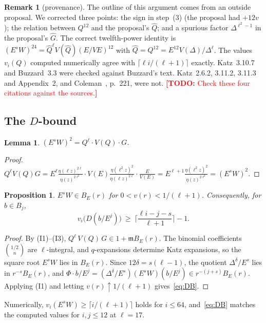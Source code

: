 \documentclass[11pt]{amsart}
\newcommand{\fm}{\mathfrak{m}}
\newcommand{\TODO}[1]{\textcolor{red}{\textbf{[TODO:} #1\textbf{]}}}
\theoremstyle{plain}
\newtheorem{proposition}[theorem]{Proposition}
\newtheorem{lemma}[theorem]{Lemma}
\theoremstyle{definition}
\newtheorem{remark}[theorem]{Remark}
\numberwithin{equation}{section}
\begin{document}
\begin{remark}[provenance]\label{rem:provenance}
The outline of this argument comes from an outside proposal. We corrected three points: the sign in step~(3) (the
proposal had $+12v$); the relation between $Q^{12}$ and the proposal's $\hat Q$; and a spurious factor
$\Delta^{\ell^2-1}$ in the proposal's $\hat G$. The correct twelfth-power identity is
$(E^sW)^{24}=\hat Q^\ell V(\hat Q)(E/VE)^{12}$ with $\hat Q=Q^{12}=E^{12}V(\Delta)/\Delta^\ell$.
The values $v_i(Q)$ computed numerically agree with $\lceil\ell i/(\ell+1)\rceil$ exactly. Katz~3.10.7 and Buzzard~3.3
were checked against Buzzard's text. Katz~2.6.2, 3.11.2, 3.11.3 and Appendix~2, and Coleman~\cite{Coleman1996}, p.~221,
were not. \TODO{Check these four citations against the sources.}
\end{remark}

\subsection{The $D$-bound}
\begin{lemma}\label{lem:eta}
$(E^sW)^2=Q^\ell\cdot V(Q)\cdot G$.
\end{lemma}
\begin{proof}
$Q^\ell V(Q)G=E^\ell\frac{\eta(\ell z)^{2\ell}}{\eta(z)^{2\ell^2}}\cdot V(E)\frac{\eta(\ell^2z)^2}{\eta(\ell z)^{2\ell}}\cdot\frac{E}{V(E)}
=E^{\ell+1}\frac{\eta(\ell^2 z)^2}{\eta(z)^{2\ell^2}}=(E^sW)^2.$
\end{proof}

\begin{proposition}\label{prop:DB}
$E^sW\in B_E(r)$ for $0<v(r)<1/(\ell+1)$. Consequently, for $b\in B_j$,
\begin{equation}\tag{DB}\label{eq:DB}
  v_i\big(D(b/E^j)\big)\ \ge\ \Big\lceil\frac{\ell i-j-s}{\ell+1}\Big\rceil-1 .
\end{equation}
\end{proposition}
\begin{proof}
By (I1)--(I3), $Q^\ell\,V(Q)\,G\in1+\fm B_E(r)$. The binomial coefficients $\binom{1/2}{n}$ are $\ell$-integral, and $q$-expansions
determine Katz expansions, so the square root $E^sW$ lies in $B_E(r)$. Since $12\delta=s(\ell-1)$, the quotient
$\Delta^\delta/E^s$ lies in $r^{-s}B_E(r)$, and
$\Phi\cdot b/E^j=(\Delta^\delta/E^s)(E^sW)(b/E^j)\in r^{-(j+s)}B_E(r)$. Applying (I1) and letting
$v(r)\uparrow1/(\ell+1)$ gives~\eqref{eq:DB}.
\end{proof}
Numerically, $v_i(E^sW)\ge\lceil i/(\ell+1)\rceil$ holds for $i\le64$, and~\eqref{eq:DB} matches the computed values for
$i,j\le12$ at $\ell=17$.
\end{document}
